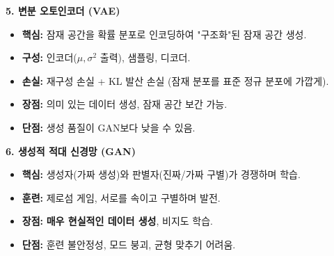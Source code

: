 \documentclass[11pt,a4paper]{article}
\begin{document}
\begin{tcolorbox}[summarybox, title=핵심 개념 요약]
\textbf{5. 변분 오토인코더 (VAE)}
\begin{itemize}
    \item \textbf{핵심:} 잠재 공간을 확률 분포로 인코딩하여 "구조화"된 잠재 공간 생성.
    \item \textbf{구성:} 인코더($\mu, \sigma^2$ 출력), 샘플링, 디코더.
    \item \textbf{손실:} 재구성 손실 + KL 발산 손실 (잠재 분포를 표준 정규 분포에 가깝게).
    \item \textbf{장점:} 의미 있는 데이터 생성, 잠재 공간 보간 가능.
    \item \textbf{단점:} 생성 품질이 GAN보다 낮을 수 있음.
\end{itemize}
\end{tcolorbox}

\begin{tcolorbox}[summarybox, title=핵심 개념 요약]
\textbf{6. 생성적 적대 신경망 (GAN)}
\begin{itemize}
    \item \textbf{핵심:} 생성자(가짜 생성)와 판별자(진짜/가짜 구별)가 경쟁하며 학습.
    \item \textbf{훈련:} 제로섬 게임, 서로를 속이고 구별하며 발전.
    \item \textbf{장점:} \textbf{매우 현실적인 데이터 생성}, 비지도 학습.
    \item \textbf{단점:} 훈련 불안정성, 모드 붕괴, 균형 맞추기 어려움.
\end{itemize}
\end{tcolorbox}
\end{document}
